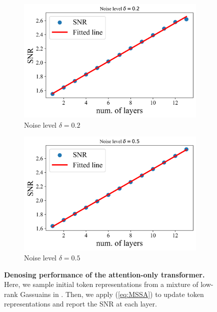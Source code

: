 \documentclass[../../book-main.tex]{subfiles}
\begin{document}
\begin{figure}[t]
    \begin{subfigure}[t]{0.45\textwidth}
        \centering
        \includegraphics[width=\textwidth]{figs_chap4/SNR1.png}
        \caption{Noise level $\delta = 0.2$}
    \end{subfigure}
    \hfill
    \begin{subfigure}[t]{0.45\textwidth}
        \centering
        \includegraphics[width=\textwidth]{figs_chap4/SNR2.png}
        \caption{Noise level $\delta = 0.5$}
    \end{subfigure}
    \caption{{\bf Denosing performance of the attention-only transformer.} Here, we sample initial token representations from a mixture of low-rank Gassuains in . Then, we apply (\ref{eq:MSSA}) to update token representations and report the SNR at each layer.}  \label{fig:MSSA} 
\end{figure} 
\end{document}
